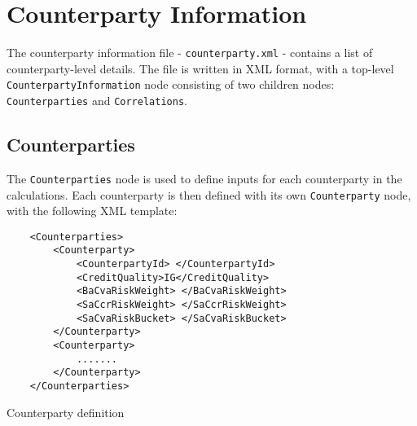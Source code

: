 \section{Counterparty Information}\label{sec:counterpartyinformation}

The counterparty information file - {\tt counterparty.xml} - 
contains a list of counterparty-level details.
The file is written in XML format, with a top-level
\lstinline!CounterpartyInformation! node consisting of two
children nodes: \lstinline!Counterparties! and
\lstinline!Correlations!.

\vspace{1em}

\subsection{Counterparties}
The \lstinline!Counterparties! node is used to define inputs
for each counterparty in the calculations. Each counterparty is
then defined with its own \lstinline!Counterparty! node, with the following
XML template:

\begin{listing}[H]
\begin{verbatim}
    <Counterparties>
        <Counterparty>
            <CounterpartyId> </CounterpartyId>
            <CreditQuality>IG</CreditQuality>
            <BaCvaRiskWeight> </BaCvaRiskWeight>
            <SaCcrRiskWeight> </SaCcrRiskWeight>
            <SaCvaRiskBucket> </SaCvaRiskBucket>
        </Counterparty>
        <Counterparty>
            .......
        </Counterparty>
    </Counterparties>
\end{verbatim}
\caption{Counterparty definition}
\label{lst:counterparties}
\end{listing}

